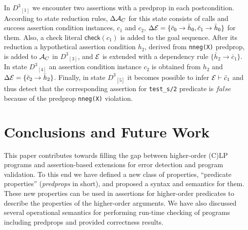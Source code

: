 \documentclass{llncs}
\newcommand{\AC}
  {\ensuremath{{\cal A}_{C}}}
\newcommand{\kbd}[1]{\mbox{\tt #1}}
\newcommand{\ADeps}{\ensuremath{{\cal E}}}
\newcommand{\nthstate}[2]{\ensuremath{{#1}_{[#2]}}}
\newcommand{\asrId}[1]{\ensuremath{c_{#1}}}
\newcommand{\negAsrId}[1]{\ensuremath{\bar{c}_{#1}}}
\newcommand{\hypId}[1]{\ensuremath{h_{#1}}}
\newcommand{\negHypId}[1]{\ensuremath{\bar{h}_{#1}}}
\newcommand{\checkLitLab}[1]{\ensuremath{\textsf{check}(#1)}}
\begin{document}
In $\nthstate{D^3}{1}$ we encounter two assertions with a predprop in
each postcondition.
According to state reduction rules, $\Delta\AC$ for this state
consists of calls and success assertion condition instances,
$\asrId{1}$ and $\asrId{2}$, $\Delta\ADeps = \{ \negAsrId{0}
\rightarrow \negHypId{0}, \negAsrId{1} \rightarrow \negHypId{0} \}$
for them.
Also, a check literal $\checkLitLab{\asrId{1}}$ is added to the goal
sequence.
After its reduction a hypothetical assertion condition $\hypId{2}$,
derived from \kbd{nneg(X)} predprop, is added to $\AC$ in
$\nthstate{D^3}{3}$, and $\ADeps$ is extended with a dependency rule
$\{\negHypId{2} \rightarrow \negAsrId{1}\}$.
In state $\nthstate{D^3}{4}$ an assertion condition instance
$\asrId{2}$ is obtained from $\hypId{2}$ and $\Delta\ADeps = \{
\negAsrId{2} \rightarrow \negHypId{2}\}$.
Finally, in state $\nthstate{D^3}{5}$ it becomes possible to infer
$\ADeps \vdash \negAsrId{1}$ and thus detect that the corresponding
assertion for \kbd{test\_s/2} predicate is $false$ because of the
predprop \kbd{nneg(X)} violation.



\section{Conclusions and Future Work}

This paper contributes towards filling the gap between higher-order
(C)LP programs and assertion-based extensions for error detection and 
program validation.
To this end we have defined a new class of properties, ``predicate
properties'' (\emph{predprops} in short), and proposed a syntax and
semantics for them. These new properties can be used in assertions for
higher-order predicates to describe the properties of the higher-order
arguments.
We have also discussed several operational semantics for performing
run-time checking of programs including predprops and provided
correctness results. 
\end{document}
